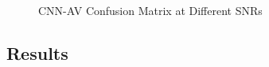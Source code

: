\documentclass[journal,onecolumn]{IEEEtran}
\begin{document}
\begin{figure}[!ht]
   \centering
   \quad
   \\
   \quad
   \caption{CNN-AV Confusion Matrix at Different SNRs}
   \label{fig:sub1}
\end{figure}

\subsection{Results}
\end{document}
